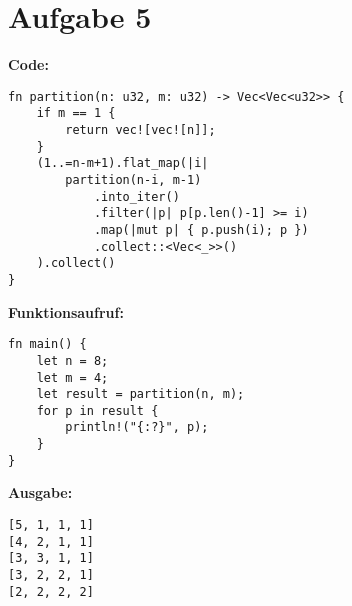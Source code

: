 \documentclass[a4paper]{scrartcl}
\begin{document}
\newpage
\section*{Aufgabe 5}
\textbf{Code:}
\begin{lstlisting}
fn partition(n: u32, m: u32) -> Vec<Vec<u32>> {
    if m == 1 {
        return vec![vec![n]];
    }
    (1..=n-m+1).flat_map(|i| 
        partition(n-i, m-1)
            .into_iter()
            .filter(|p| p[p.len()-1] >= i)
            .map(|mut p| { p.push(i); p })
            .collect::<Vec<_>>()
    ).collect()
}
\end{lstlisting}
\textbf{Funktionsaufruf:}
\begin{lstlisting}
fn main() {
    let n = 8;
    let m = 4;
    let result = partition(n, m);
    for p in result {
        println!("{:?}", p);
    }
}
\end{lstlisting}

\textbf{Ausgabe:}
\begin{lstlisting}
[5, 1, 1, 1]
[4, 2, 1, 1]
[3, 3, 1, 1]
[3, 2, 2, 1]
[2, 2, 2, 2]
\end{lstlisting}
\end{document}
